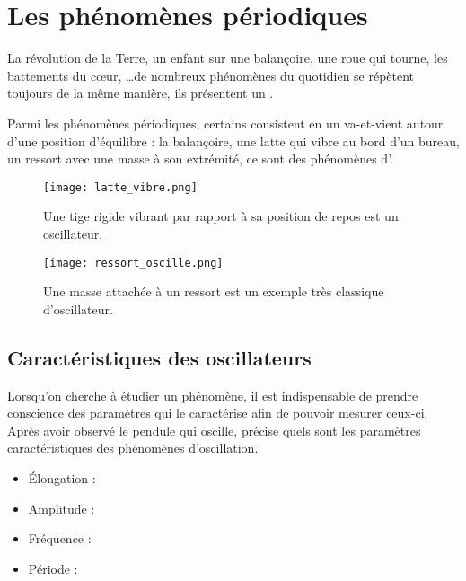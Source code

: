 \chapter{Les phénomènes périodiques}
La révolution de la Terre, un enfant sur une balançoire, une roue qui tourne, les battements du c\oe{}ur, \ldots de nombreux phénomènes du quotidien se répètent toujours de la même manière, ils présentent un .

Parmi les phénomènes périodiques, certains consistent en un va-et-vient autour d'une position d'équilibre : la balançoire, une latte qui vibre au bord d'un bureau, un ressort avec une masse à son extrémité, ce sont des phénomènes d'.
\begin{figure}[h!]
    \begin{minipage}{.5\textwidth}
        \centering
        \texttt{[image: latte\_vibre.png]}
        \caption{Une tige rigide vibrant par rapport à sa position de repos est un oscillateur.}
        \label{lame_vibre}
    \end{minipage}
    \begin{minipage}{.5\textwidth}
        \centering
        \texttt{[image: ressort\_oscille.png]}
        \caption{Une masse attachée à un ressort est un exemple très classique d'oscillateur.}
        \label{lame_vibre_2}
    \end{minipage}
\end{figure}

\newpage

\section{Caractéristiques des oscillateurs}
Lorsqu'on cherche à étudier un phénomène, il est indispensable de prendre conscience des paramètres qui le caractérise afin de pouvoir mesurer ceux-ci.
Après avoir observé le pendule qui oscille, précise quels sont les paramètres caractéristiques des phénomènes d'oscillation.
\begin{itemize}[label=\textbullet]
    \item Élongation : \dotfill
    \item Amplitude : \dotfill
    \item Fréquence : \dotfill
    \item Période : \dotfill
\end{itemize}

